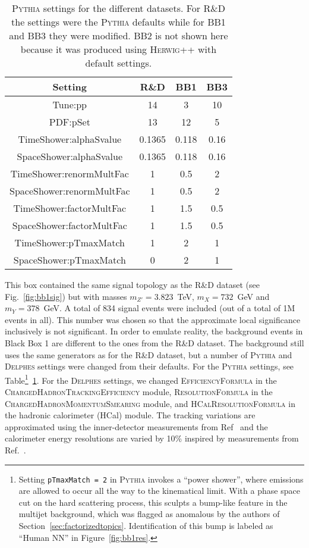 \documentclass[a4paper,11pt]{article}
\begin{document}
\begin{table}
\begin{centering}
\begin{tabular}{|c|c|c|c|}
\hline 
Setting & R\&D & BB1  & BB3\\
\hline
Tune:pp & 14 & 3 &     10                   \\
PDF:pSet &  13 & 12 & 5\\
TimeShower:alphaSvalue &  0.1365 & 0.118 & 0.16\\
SpaceShower:alphaSvalue & 0.1365 & 0.118 & 0.16\\
TimeShower:renormMultFac & 1 & 0.5 & 2\\
SpaceShower:renormMultFac & 1 & 0.5 &2\\
TimeShower:factorMultFac & 1 & 1.5 &0.5\\
SpaceShower:factorMultFac & 1 & 1.5 &0.5\\
TimeShower:pTmaxMatch & 1 & 2 & 1 \\
SpaceShower:pTmaxMatch & 0 & 2     &1\\    
\hline 
\end{tabular} 
\caption{\textsc{Pythia} settings for the different datasets. For R\&D the settings were the \textsc{Pythia} defaults while for BB1 and BB3 they were modified. BB2 is not shown here because it was produced using \textsc{Herwig}++ with default settings.}
\label{tab:pythiasettings}
\end{centering}
\end{table}

This box contained the same signal topology as the R\&D dataset (see Fig.~\ref{fig:bb1sig}) but with masses $m_{Z'}=3.823$~TeV, $m_{X}=732$~GeV and $m_Y=378$~GeV. A total of 834 signal events were included (out of a total of 1M events in all).  This number was chosen so that the approximate local significance inclusively is not significant.  In order to emulate reality, the background events in Black Box 1 are different to the ones from the R\&D dataset.  The background still uses the same generators as for the R\&D dataset, but a number of \textsc{Pythia} and \textsc{Delphes} settings were changed from their defaults. For the \textsc{Pythia} settings, see Table\footnote{Setting \texttt{pTmaxMatch = 2} in \textsc{Pythia} invokes a ``power shower'', where emissions are allowed to occur all the way to the kinematical limit.  With a phase space cut on the hard scattering process, this sculpts a bump-like feature in the multijet background, which was flagged as anomalous by the authors of Section~\ref{sec:factorizedtopics}.  Identification of this bump is labeled as ``Human NN'' in Figure~\ref{fig:bb1res}.}~\ref{tab:pythiasettings}. For the \textsc{Delphes} settings, we changed \textsc{EfficiencyFormula} in the \textsc{ChargedHadronTrackingEfficiency} module, \textsc{ResolutionFormula} in the \textsc{ChargedHadronMomentumSmearing} module, and \textsc{HCalResolutionFormula} in the hadronic calorimeter (HCal) module.  The tracking variations are approximated using the inner-detector measurements from Ref~\cite{Aad:2016jkr} and the calorimeter energy resolutions are varied by 10\% inspired by measurements from Ref.~\cite{Aaboud:2016hwh}.
\end{document}
